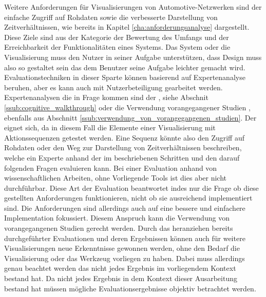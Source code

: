 \documentclass[draft=false
              ,paper=a4
              ,twoside=false
              ,fontsize=11pt
              ,headsepline
              ,BCOR10mm
              ,DIV11
              ]{scrbook}
\begin{document}
Weitere Anforderungen für Visualisierungen von Automotive-Netzwerken sind der einfache Zugriff auf Rohdaten sowie die verbesserte Darstellung von Zeitverhältnissen, wie bereits in Kapitel \ref{cha:anforderungsanalyse} dargestellt. Diese Ziele sind aus der Kategorie der Bewertung des Umfangs und der Erreichbarkeit der Funktionalitäten eines Systems. Das System oder die Visualisierung muss den Nutzer in seiner Aufgabe unterstützen, dass Design muss also so gestaltet sein das dem Benutzer seine Aufgabe leichter gemacht wird. Evaluationstechniken in dieser Sparte können basierend auf Expertenanalyse beruhen, aber es kann auch mit Nutzerbeteiligung gearbeitet werden. Expertenanalysen die in Frage kommen sind der , siehe Abschnit \ref{ssub:cognitive_walkthrough} oder die Verwendung vorangegangener Studien , ebenfalls aus Abschnitt \ref{ssub:verwendung_von_vorangegangenen_studien}. Der  eignet sich, da in diesem Fall die Elemente einer Visualisierung mit Aktionssequenzen getestet werden. Eine Sequenz könnte also den Zugriff auf Rohdaten oder den Weg zur Darstellung von Zeitverhältnissen beschreiben, welche ein Experte anhand der im  beschriebenen Schritten und den darauf folgenden Fragen evaluieren kann. Bei einer Evaluation anhand von wissenschaftlichen Arbeiten, ohne Vorliegende Tools ist dies aber nicht durchführbar. Diese Art der Evaluation beantwortet indes nur die Frage ob diese gestellten Anforderungen funktionieren, nicht ob sie ausreichend implementiert sind. Die Anforderungen sind allerdings auch auf eine bessere und einfachere Implementation fokussiert. Diesem Anspruch kann die Verwendung von vorangegangenen Studien gerecht werden. Durch das heranziehen bereits durchgeführter Evaluationen und deren Ergebnissen können auch für weitere Visualisierungen neue Erkenntnisse gewonnen werden, ohne den Bedarf die Visualisierung oder das Werkzeug vorliegen zu haben. Dabei muss allerdings genau beachtet werden das nicht jedes Ergebnis im vorliegendem Kontext bestand hat. Da nicht jedes Ergebnis in dem Kontext dieser Ausarbeitung bestand hat müssen mögliche Evaluationsergebnisse objektiv betrachtet werden.  
\end{document}
